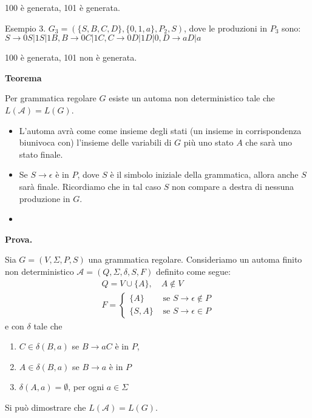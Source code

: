 100 è generata, 101 è generata.

\vspace{5mm}


Esempio 3. $G_{3}=\left(\{S, B, C, D\},\{0,1, a\}, P_{2}, S\right)$, dove le
produzioni in $P_{3}$ sono:
$S \rightarrow 0 S|1 S| 1 B, B \rightarrow 0 C|1 C, C \rightarrow 0 D| 1 D|0, D \rightarrow a D| a$

100 è generata, 101 non è generata.


\textbf{Teorema}

Per grammatica regolare $G$ esiste un automa non deterministico tale che $L(\mathcal{A})=L(G)$.
\begin{itemize}
    \item L'automa avrà come come insieme degli stati (un insieme in corrispondenza biunivoca con) l'insieme delle variabili di $G$ più uno stato $A$ che sarà uno stato finale.
    \item Se $S \rightarrow \epsilon$ è in $P$, dove $S$ è il simbolo iniziale della grammatica, allora anche $S$ sarà finale. Ricordiamo che in tal caso $S$ non compare a destra di nessuna produzione in $G$.
    \item 
\end{itemize}

\textbf{Prova.} 

Sia $G=(V, \Sigma, P, S)$ una grammatica regolare. Consideriamo un automa finito non deterministico $\mathcal{A}=(Q, \Sigma, \delta, S, F)$ definito come segue:
$$
\begin{gathered}
Q=V \cup\{A\}, \quad A \notin V \\
F= \begin{cases}\{A\} & \text { se } S \rightarrow \epsilon \notin P \\
\{S, A\} & \text { se } S \rightarrow \epsilon \in P\end{cases}
\end{gathered}
$$
e con $\delta$ tale che
\begin{enumerate}
    \item $C \in \delta(B, a)$ se $B \rightarrow a C$ è in $P$,
    \item $A \in \delta(B, a)$ se $B \rightarrow a$ è in $P$
    \item $\delta(A, a)=\emptyset$, per ogni $a \in \Sigma$
\end{enumerate}

Si può dimostrare che $L(\mathcal{A})=L(G)$.

\vspace{5mm}

